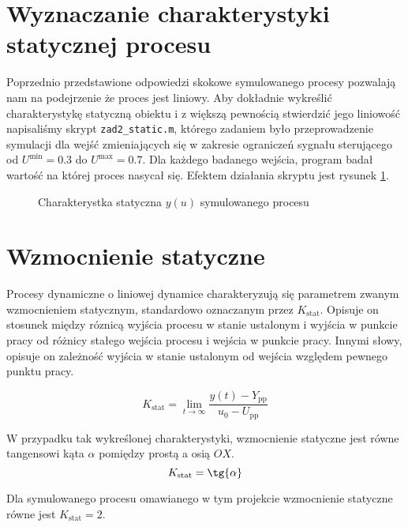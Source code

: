 \section{Wyznaczanie charakterystyki statycznej procesu}
\label{zad2_char_stat}
Poprzednio przedstawione odpowiedzi skokowe symulowanego procesy pozwalają nam
na podejrzenie że proces jest liniowy. Aby dokładnie wykreślić charakterystykę statyczną 
obiektu i z większą pewnością stwierdzić jego liniowość napisaliśmy skrypt \verb+zad2_static.m+,
którego zadaniem było przeprowadzenie symulacji dla wejść zmieniających się w zakresie ograniczeń
sygnału sterującego od $U^{\mathrm{min}} = \num{0.3}$ do $U^{\mathrm{max}} = \num{0.7}$. Dla każdego 
badanego wejścia, program badał wartość na której proces nasycał się. Efektem działania skryptu
jest rysunek \ref{zad2_stat_wykres}. 

\begin{figure}[b]
    \centering
    \caption{Charakterystka statyczna $y(u)$ symulowanego procesu}
    \label{zad2_stat_wykres}
\end{figure}

\section{Wzmocnienie statyczne}
\label{zad2_wzmocnienie}
Procesy dynamiczne o liniowej dynamice charakteryzują się 
parametrem zwanym wzmocnieniem statycznym, 
standardowo oznaczanym przez $K_{\mathrm{stat}}$.
Opisuje on stosunek między róznicą wyjścia procesu w stanie ustalonym i wyjścia w punkcie pracy
od różnicy stałego wejścia procesu i wejścia w punkcie pracy. Innymi słowy, opisuje on zależność
wyjścia w stanie ustalonym od wejścia względem pewnego punktu pracy.

\begin{equation}
K_{\mathrm{stat}} = \lim_{t \to \infty} \frac{y(t)- Y_{\mathrm{pp}}}{u_0 - U_{\mathrm{pp}}}
\end{equation}

W przypadku tak wykreślonej charakterystyki, wzmocnienie statyczne jest równe tangensowi kąta $\alpha$
pomiędzy prostą a osią $OX$. 
\begin{equation}
K_{\mathrm{stat}} = \tg{\alpha}
\end{equation}

Dla symulowanego procesu omawianego w tym projekcie wzmocnienie statyczne 
równe jest $K_{\mathrm{stat}} = 2$. 



